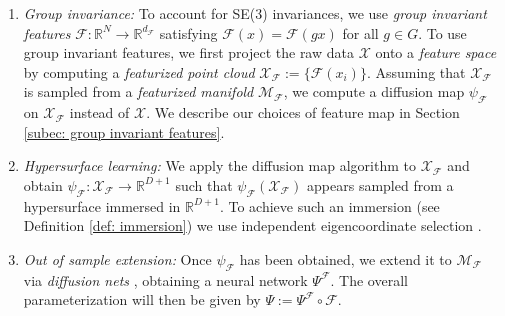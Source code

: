 \documentclass[reqno, 12pt]{article}
\begin{document}
\begin{enumerate}
    \item \emph{Group invariance:} To account for SE(3) invariances, we use \emph{group invariant features} $\mathcal{F}: \mathbb{R}^{N} \to \mathbb{R}^{d_{\mathcal{F}}}$ satisfying $\mathcal{F}(x) = \mathcal{F}(gx)$ for all $g \in G$. To use group invariant features, we first project the raw data $\mathcal{X}$ onto a \emph{feature space} by computing a \emph{featurized point cloud} $\mathcal{X}_{\mathcal{F}} := \{\mathcal{F}(x_i)\}$. Assuming that $\mathcal{X}_{\mathcal{F}}$ is sampled from a \emph{featurized manifold} $\mathcal{M}_{\mathcal{F}}$, we compute a diffusion map $\psi_{\mathcal{F}}$ on $\mathcal{X}_{\mathcal{F}}$ instead of $\mathcal{X}$. We describe our choices of feature map in Section \eqref{subec: group invariant features}. 
    \item \emph{Hypersurface learning:} We apply the diffusion map algorithm to $\mathcal{X}_{\mathcal{F}}$ and obtain $\psi_{\mathcal{F}}: \mathcal{X}_{\mathcal{F}} \to \mathbb{R}^{D+1}$ such that $\psi_{\mathcal{F}}(\mathcal{X}_{\mathcal{F}})$ appears sampled from a hypersurface immersed in $\mathbb{R}^{D+1}$. To achieve such an immersion (see Definition \eqref{def: immersion}) we use independent eigencoordinate selection \parencite{chen2019selecting}.  
    \item \emph{Out of sample extension:} Once $\psi_{\mathcal{F}}$ has been obtained, we extend it to $\mathcal{M}_{\mathcal{F}}$ via \emph{diffusion nets} \parencite{mishne2019diffusion}, obtaining a neural network $\Psi^{\mathcal{F}}$. The overall parameterization will then be given by $\Psi := \Psi^{\mathcal{F}}\circ \mathcal{F}$. 
\end{enumerate}
\end{document}

